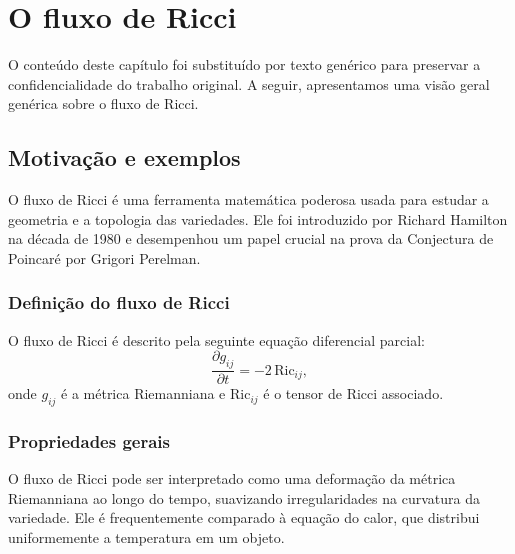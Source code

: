 \pagestyle{MyFancy}
\color{gal}
\chapter{O fluxo de Ricci}
\label{cap:OFLUXO}

\PlaceText{69mm}{35mm}{ \color{gal}\noindent\makebox[\linewidth]{\rule{2\paperwidth}{1pt}}}

\PlaceText{69mm}{79mm}{ \color{gal}\noindent\makebox[\linewidth]{\rule{2\paperwidth}{1pt}}}

\PlaceText{15mm}{13mm}{ \color{white}\noindent\makebox[\linewidth]{\rule{2\paperwidth}{10pt}}}

\color{black}

O conteúdo deste capítulo foi substituído por texto genérico para preservar a confidencialidade do trabalho original. A seguir, apresentamos uma visão geral genérica sobre o fluxo de Ricci.

\section{Motivação e exemplos}

O fluxo de Ricci é uma ferramenta matemática poderosa usada para estudar a geometria e a topologia das variedades. Ele foi introduzido por Richard Hamilton na década de 1980 e desempenhou um papel crucial na prova da Conjectura de Poincaré por Grigori Perelman.

\subsection{Definição do fluxo de Ricci}

O fluxo de Ricci é descrito pela seguinte equação diferencial parcial:
\[
\frac{\partial g_{ij}}{\partial t} = -2 \, \mathrm{Ric}_{ij},
\]
onde \( g_{ij} \) é a métrica Riemanniana e \( \mathrm{Ric}_{ij} \) é o tensor de Ricci associado.

\subsection{Propriedades gerais}

O fluxo de Ricci pode ser interpretado como uma deformação da métrica Riemanniana ao longo do tempo, suavizando irregularidades na curvatura da variedade. Ele é frequentemente comparado à equação do calor, que distribui uniformemente a temperatura em um objeto.

